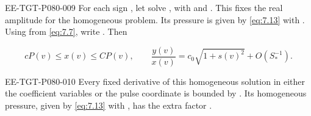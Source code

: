 \begin{lemma}\label{lem:7.4}
\begin{EESegment}{EE-TGT-P080-009}
For each sign , let  solve , with  and . This fixes the real amplitude for the homogeneous  problem. Its pressure is given by \eqref{eq:7.13} with . Using  from \eqref{eq:7.7}, write . Then
\end{EESegment}
\begin{equation}
  cP(v)\leq x(v)\leq CP(v),
  \qquad
  \frac{y(v)}{x(v)}=c_0\sqrt{1+s(v)^2}+O(S_*^{-1}).
  \tag{7.21}\label{eq:7.21}
\end{equation}
\begin{EESegment}{EE-TGT-P080-010}
Every fixed derivative of this homogeneous solution in either the coefficient variables or the pulse coordinate is bounded by . Its homogeneous pressure, given by \eqref{eq:7.13} with , has the extra factor .
\end{EESegment}
\end{lemma}
%
